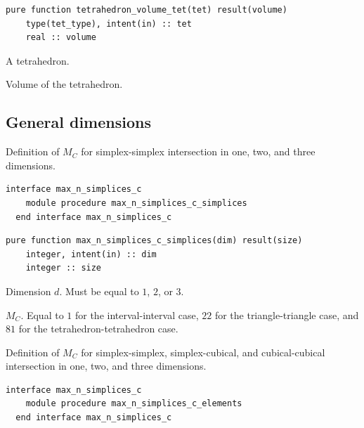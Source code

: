 \documentclass{article}
\begin{document}
\begin{lstlisting}[language=FORTRAN]
  pure function tetrahedron_volume_tet(tet) result(volume)
    type(tet_type), intent(in) :: tet
    real :: volume
\end{lstlisting}

\begin{description}[font=\ttfamily\bfseries,leftmargin=2.2\parindent,labelindent=1.7\parindent,noitemsep]
  \item[tet] A tetrahedron.
  \item[volume] Volume of the tetrahedron.
\end{description}

\subsection{General dimensions}\label{sect:nD_intersection}

Definition of $M_C$ for simplex-simplex intersection in one, two, and three
dimensions.

\begin{lstlisting}[language=FORTRAN]
  interface max_n_simplices_c
    module procedure max_n_simplices_c_simplices
  end interface max_n_simplices_c
\end{lstlisting}

\begin{lstlisting}[language=FORTRAN]
  pure function max_n_simplices_c_simplices(dim) result(size)
    integer, intent(in) :: dim
    integer :: size
\end{lstlisting}

\begin{description}[font=\ttfamily\bfseries,leftmargin=2.2\parindent,labelindent=1.7\parindent,noitemsep]
  \item[dim] Dimension $d$. Must be equal to $1$, $2$, or $3$.
  \item[size] $M_C$. Equal to $1$ for the interval-interval case, $22$ for the
    triangle-triangle case, and $81$ for the tetrahedron-tetrahedron case.
\end{description}

\noindent Definition of $M_C$ for simplex-simplex, simplex-cubical, and
cubical-cubical intersection in one, two, and three dimensions.
  
\begin{lstlisting}[language=FORTRAN]
  interface max_n_simplices_c
    module procedure max_n_simplices_c_elements
  end interface max_n_simplices_c
\end{lstlisting}
\end{document}
